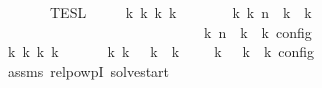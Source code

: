 \begin{isabellebody}
\ \ \ {\isacartoucheopen}{\isasymrho}\ {\isasymin}\ {\isasymlbrakk}{\isasymlbrakk}\ {\isasymPsi}\ {\isasymrbrakk}{\isasymrbrakk}\isactrlsub T\isactrlsub E\isactrlsub S\isactrlsub L{\isacartoucheclose}\isanewline
\ \ \ \ \ {\isacartoucheopen}{\isasymexists}k\ {\isasymGamma}\isactrlsub k\ {\isasymPsi}\isactrlsub k\ {\isasymPhi}\isactrlsub k{\isachardot}\ {\isacharparenleft}{\isacharparenleft}{\isacharbrackleft}{\isacharbrackright}{\isacharcomma}\ {}\ {\isasymturnstile}\ {\isasymPsi}\ {\isasymtriangleright}\ {\isacharbrackleft}{\isacharbrackright}{\isacharparenright}\ \ {\isasymhookrightarrow}\isactrlbsup k\isactrlesup \ {\isacharparenleft}{\isasymGamma}\isactrlsub k{\isacharcomma}\ n\ {\isasymturnstile}\ {\isasymPsi}\isactrlsub k\ {\isasymtriangleright}\ {\isasymPhi}\isactrlsub k{\isacharparenright}{\isacharparenright}\isanewline
\ \ \ \ \ \ \ \ \ \ \ \ \ \ \ \ \ \ \ \ \ \ \ \ \ {\isasymand}\ {\isasymrho}\ {\isasymin}\ {\isasymlbrakk}\ {\isasymGamma}\isactrlsub k{\isacharcomma}\ n\ {\isasymturnstile}\ {\isasymPsi}\isactrlsub k\ {\isasymtriangleright}\ {\isasymPhi}\isactrlsub k\ {\isasymrbrakk}\isactrlsub c\isactrlsub o\isactrlsub n\isactrlsub f\isactrlsub i\isactrlsub g{\isacartoucheclose}\isanewline
%
\isadelimproof
%
\endisadelimproof
%
\isatagproof
{}\isamarkupfalse%
\ {\isacharminus}\isanewline
\ \ \isamarkupfalse%
\ {}{\isacharcolon}{\isacartoucheopen}{\isasymexists}{\isasymGamma}\isactrlsub k\ {\isasymPsi}\isactrlsub k\ {\isasymPhi}\isactrlsub k\ k{\isachardot}\ {\isacharparenleft}{\isacharparenleft}{\isacharbrackleft}{\isacharbrackright}{\isacharcomma}\ {}\ {\isasymturnstile}\ {\isasymPsi}\ {\isasymtriangleright}\ {\isacharbrackleft}{\isacharbrackright}{\isacharparenright}\ {\isasymhookrightarrow}\isactrlbsup k\isactrlesup \ {\isacharparenleft}{\isasymGamma}\isactrlsub k{\isacharcomma}\ {}\ {\isasymturnstile}\ {\isasymPsi}\isactrlsub k\ {\isasymtriangleright}\ {\isasymPhi}\isactrlsub k{\isacharparenright}{\isacharparenright}\ {\isasymand}\ {\isasymrho}\ {\isasymin}\ {\isasymlbrakk}\ {\isasymGamma}\isactrlsub k{\isacharcomma}\ {}\ {\isasymturnstile}\ {\isasymPsi}\isactrlsub k\ {\isasymtriangleright}\ {\isasymPhi}\isactrlsub k\ {\isasymrbrakk}\isactrlsub c\isactrlsub o\isactrlsub n\isactrlsub f\isactrlsub i\isactrlsub g{\isacartoucheclose}\isanewline
\ \ \ \ \isamarkupfalse%
\ assms\ relpowp{\isacharunderscore}{}{\isacharunderscore}I\ solve{\isacharunderscore}start\ \isamarkupfalse%

\end{isabellebody}
